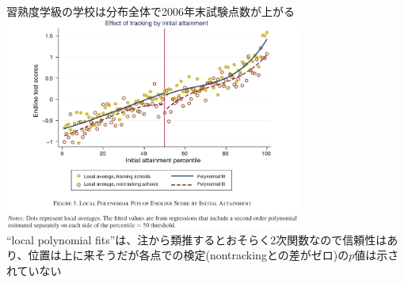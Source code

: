\begin{frame}{}
習熟度学級の学校は分布全体で2006年末試験点数が上がる\\
\hfil\includegraphics[height = 7cm]{ImpactEvaluation/figure/DufloDupasKremer_KenyaTrackingPeerEffectFigure3.jpg}\\
``local polynomial fits''は、注から類推するとおそらく2次関数なので信頼性はあり、位置は上に来そうだが各点での検定(nontrackingとの差がゼロ)の$p$値は示されていない
\end{frame}

\begin{frame}[t]{}
\begin{columns}[T]
\column{.7\paperwidth}
\column{.25\paperwidth}
\\
\end{columns}

\vspace*{-6.7cm}
\end{frame}

